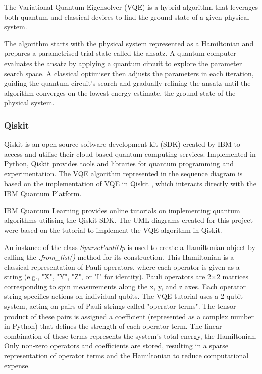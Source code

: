 \documentclass{article}
\newcounter{subsubsubsection}[subsubsection]
\begin{document}
The Variational Quantum Eigensolver (VQE) is a hybrid algorithm that leverages both quantum and classical devices to find the ground state of a given physical system. 

The algorithm starts with the physical system represented as a Hamiltonian and prepares a parametrised trial state called the ansatz. A quantum computer evaluates the ansatz by applying a quantum circuit to explore the parameter search space. A classical optimiser then adjusts the parameters in each iteration, guiding the quantum circuit’s search and gradually refining the ansatz until the algorithm converges on the lowest energy estimate, the ground state of the physical system.

\subsubsection{Qiskit}

Qiskit is an open-source software development kit (SDK) created by IBM to access and utilise their cloud-based quantum computing services. Implemented in Python, Qiskit provides tools and libraries for quantum programming and experimentation. The VQE algorithm represented in the sequence diagram is based on the implementation of VQE in Qiskit \cite{IBM2024}, which interacts directly with the IBM Quantum Platform.


IBM Quantum Learning provides online tutorials\cite{Tutorial} on implementing quantum algorithms utilising the Qiskit SDK. The UML diagrams created for this project were based on the tutorial to implement the VQE algorithm in Qiskit\cite{IBM2024}.

An instance of the class \textit{SparsePauliOp} is used to create a Hamiltonian object by calling the \textit{.from\_list()} method for its construction. This Hamiltonian is a classical representation of Pauli operators, where each operator is given as a string (e.g., "X", "Y", "Z", or "I" for identity). Pauli operators are 2×2 matrices corresponding to spin measurements along the x, y, and z axes\cite{DJORDJEVIC201229}. Each operator string specifies actions on individual qubits. The VQE tutorial uses a 2-qubit system, acting on pairs of Pauli strings called "operator terms". The tensor product of these pairs is assigned a coefficient (represented as a complex number in Python) that defines the strength of each operator term. The linear combination of these terms represents the system's total energy, the Hamiltonian. Only non-zero operators and coefficients are stored, resulting in a sparse representation of operator terms and the Hamiltonian to reduce computational expense.
\end{document}
